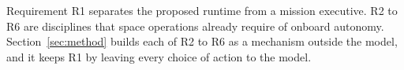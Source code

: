 
Requirement R1 separates the proposed runtime from a mission executive. R2 to R6 are disciplines that space operations
already require of onboard autonomy. Section~\ref{sec:method} builds each of R2 to R6 as a mechanism outside the model,
and it keeps R1 by leaving every choice of action to the model.
